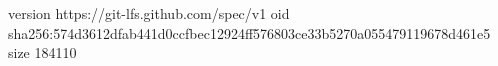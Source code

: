 version https://git-lfs.github.com/spec/v1
oid sha256:574d3612dfab441d0ccfbec12924ff576803ce33b5270a055479119678d461e5
size 184110
